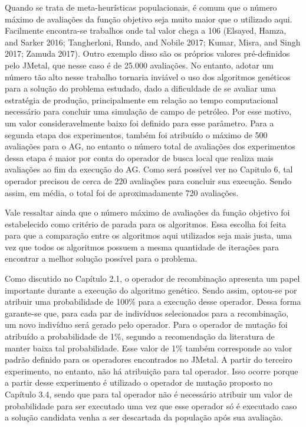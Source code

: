 Quando se trata de meta-heurísticas populacionais, é comum que o número máximo de avaliações da função objetivo seja muito maior que o utilizado aqui. Facilmente encontra-se trabalhos onde tal valor chega a 106 (Elsayed, Hamza, and Sarker 2016; Tangherloni, Rundo, and Nobile 2017; Kumar, Misra, and Singh 2017; Zamuda 2017). Outro exemplo disso são os próprios valores pré-definidos pelo JMetal, que nesse caso é de 25.000 avaliações. No entanto, adotar um número tão alto nesse trabalho tornaria inviável o uso dos algoritmos genéticos para a solução do problema estudado, dado a dificuldade de se avaliar uma estratégia de produção, principalmente em relação ao tempo computacional necessário para concluir uma simulação de campo de petróleo. Por esse motivo, um valor consideravelmente baixo foi definido para esse parâmetro. Para a segunda etapa dos experimentos, também foi atribuído o máximo de 500 avaliações para o AG, no entanto o número total de avaliações dos experimentos dessa etapa é maior por conta do operador de busca local que realiza mais avaliações ao fim da execução do AG. Como será possível ver no Capitulo 6, tal operador precisou de cerca de 220 avaliações para concluir sua execução. Sendo assim, em média, o total foi de aproximadamente 720 avaliações.

Vale ressaltar ainda que o número máximo de avaliações da função objetivo foi estabelecido como critério de parada para os algoritmos. Essa escolha foi feita para que a comparação entre os algoritmos aqui utilizados seja mais justa, uma vez que todos os algoritmos possuem a mesma quantidade de iterações para encontrar a melhor solução possível para o problema. 

Como discutido no Capítulo 2.1, o operador de recombinação apresenta um papel importante durante a execução do algoritmo genético. Sendo assim, optou-se por atribuir uma probabilidade de 100\% para a execução desse operador. Dessa forma garante-se que, para cada par de indivíduos selecionados para a recombinação, um novo indivíduo será gerado pelo operador. Para o operador de mutação foi atribuído a probabilidade de 1\%, segundo a recomendação da literatura de manter baixa tal probabilidade. Esse valor de 1\% também corresponde ao valor padrão definido para os operadores encontrados no JMetal. A partir do terceiro experimento, no entanto, não há atribuição para tal operador. Isso ocorre porque a partir desse experimento é utilizado o operador de mutação proposto no Capítulo 3.4, sendo que para tal operador não é necessário atribuir um valor de probabilidade para ser executado uma vez que esse operador só é executado caso a solução candidata venha a ser descartada da população após sua avaliação.

